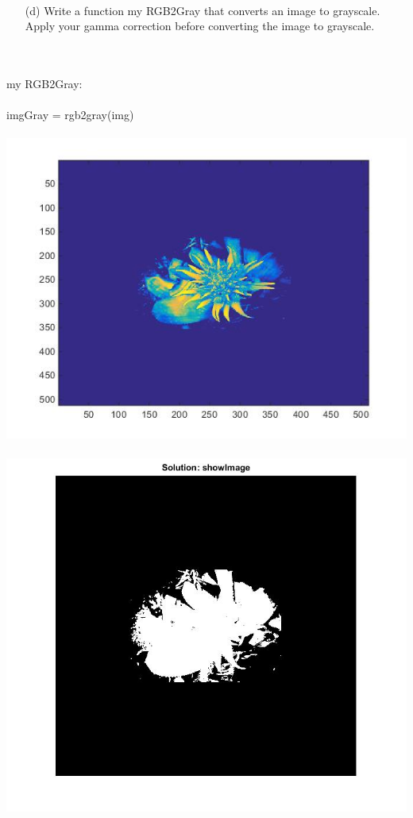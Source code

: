         \\ \pagebreak
    \begin{enumerate}        
        \item[(d)] {Write a function my RGB2Gray that converts an image to grayscale. Apply your gamma correction before converting the image to grayscale.}
    \end{enumerate}        
        \\
        \\ my RGB2Gray:
        \\\\ imgGray = rgb2gray(img)
        \\\\
        \includegraphics[scale=0.4]{images/SolutionImagD.jpg}
        \\ \ \\
        \includegraphics[scale=0.4]{images/SolutionImagD2.jpg}
